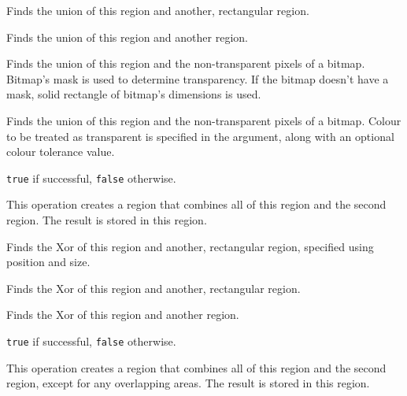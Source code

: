 Finds the union of this region and another, rectangular region.


Finds the union of this region and another region.


Finds the union of this region and the non-transparent pixels of a
bitmap. Bitmap's mask is used to determine transparency. If the bitmap doesn't
have a mask, solid rectangle of bitmap's dimensions is used.


Finds the union of this region and the non-transparent pixels of a
bitmap. Colour to be treated as transparent is specified in the
 argument, along with an
optional colour tolerance value.


{\tt true} if successful, {\tt false} otherwise.


This operation creates a region that combines all of this region and the second region.
The result is stored in this region.


\label{wxregionxor}


Finds the Xor of this region and another, rectangular region, specified using position and size.


Finds the Xor of this region and another, rectangular region.


Finds the Xor of this region and another region.


{\tt true} if successful, {\tt false} otherwise.


This operation creates a region that combines all of this region and the second region, except
for any overlapping areas. The result is stored in this region.


